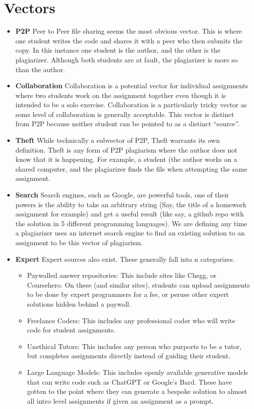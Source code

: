 \documentclass[12pt,final,thesis,actual]{uhthesis}
\begin{document}
\section{\textbf{Vectors}}
\begin{itemize}
\item \textbf{P2P} Peer to Peer file sharing seems the most obvious vector.  This is where one student writes the code and shares it with a peer who then submits the copy.  In this instance one student is the author, and the other is the plagiarizer.  Although both students are at fault, the plagiarizer is more so than the author.  
	
	\item \textbf{Collaboration} Collaboration is a potential vector for individual assignments where two students work on the assignment together even though it is intended to be a solo exercise.  Collaboration is a particularly tricky vector as some level of collaboration is generally acceptable.  This vector is distinct from P2P because neither student can be pointed to as a distinct ``source''.
	
	\item \textbf{Theft}  While technically a subvector of P2P, Theft warrants its own definition.  Theft is any form of P2P plagiarism where the author does not know that it is happening.  For example, a student (the author works on a shared computer, and the plagiarizer finds the file when attempting the same assignment.  
	
	\item \textbf{Search}  Search engines, such as Google, are powerful tools, one of their powers is the ability to take an arbitrary string (Say, the title of a homework assignment for example) and get a useful result (like say, a github repo with the solution in 5 different programming languages).  We are defining any time a plagiarizer uses an internet search engine to find an existing solution to an assignment to be this vector of plagiarism.
	
	\item \textbf{Expert} Expert sources also exist.  These generally fall into n categorizes.
	\begin{itemize}
	\item Paywalled answer repositories:  This include sites like Chegg, or Coursehero.  On these (and similar sites), students can upload assignments to be done by expert programmers for a fee, or peruse other expert solutions hidden behind a paywall.  
	\item Freelance Coders: This includes any professional coder who will write code for student assignments.
	\item Unethical Tutors: This includes any person who purports to be a tutor, but completes assignments directly instead of guiding their student.
	\item Large Language Models:  This includes openly available generative models that can write code such as ChatGPT or Google's Bard.  These have gotten to the point where they can generate a bespoke solution to almost all intro level assignments if given an assignment as a prompt.
	

\end{itemize}
\end{itemize}
\end{document}
